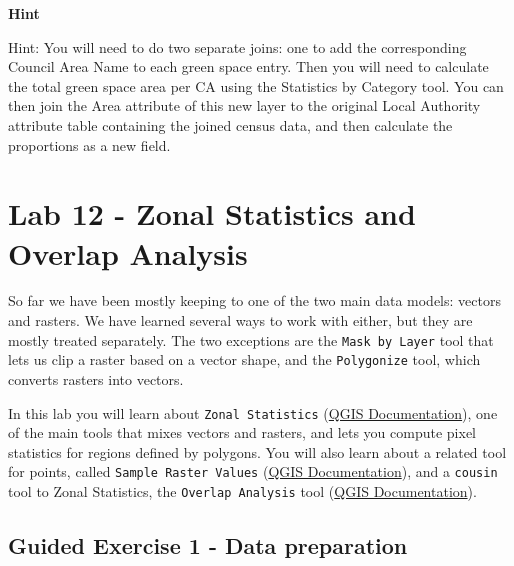\documentclass[
  letterpaper,
  DIV=11,
  numbers=noendperiod]{scrreprt}
\begin{document}
\begin{tcolorbox}[enhanced jigsaw, toprule=.15mm, breakable, left=2mm, colframe=quarto-callout-tip-color-frame, colback=white, arc=.35mm, leftrule=.75mm, opacityback=0, rightrule=.15mm, bottomrule=.15mm]

\vspace{-3mm}\textbf{Hint}\vspace{3mm}

Hint: You will need to do two separate joins: one to add the
corresponding Council Area Name to each green space entry. Then you will
need to calculate the total green space area per CA using the Statistics
by Category tool. You can then join the Area attribute of this new layer
to the original Local Authority attribute table containing the joined
census data, and then calculate the proportions as a new field.

\end{tcolorbox}

\chapter{Lab 12 - Zonal Statistics and Overlap
Analysis}\label{sec-spatan3}

So far we have been mostly keeping to one of the two main data models:
vectors and rasters. We have learned several ways to work with either,
but they are mostly treated separately. The two exceptions are the
\texttt{Mask\ by\ Layer} tool that lets us clip a raster based on a
vector shape, and the \texttt{Polygonize} tool, which converts rasters
into vectors.

In this lab you will learn about \texttt{Zonal\ Statistics}
(\href{https://docs.qgis.org/3.34/en/docs/user_manual/processing_algs/qgis/rasteranalysis.html\#zonal-statistics}{QGIS
Documentation}), one of the main tools that mixes vectors and rasters,
and lets you compute pixel statistics for regions defined by polygons.
You will also learn about a related tool for points, called
\texttt{Sample\ Raster\ Values}
(\href{https://docs.qgis.org/3.34/en/docs/user_manual/processing_algs/qgis/rasteranalysis.html\#sample-raster-values}{QGIS
Documentation}), and a \texttt{cousin} tool to Zonal Statistics, the
\texttt{Overlap\ Analysis} tool
(\href{https://docs.qgis.org/3.34/en/docs/user_manual/processing_algs/qgis/vectoranalysis.html\#overlap-analysis}{QGIS
Documentation}).

\section{Guided Exercise 1 - Data
preparation}\label{guided-exercise-1---data-preparation}
\end{document}
